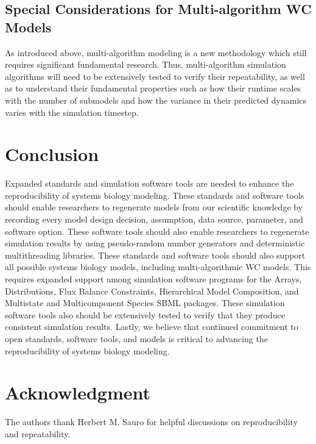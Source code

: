 \documentclass[journal,transmag,twoside]{IEEEtran}
\begin{document}
\subsection{Special Considerations for Multi-algorithm WC Models}
As introduced above, multi-algorithm modeling is a new methodology which still requires significant fundamental research. Thus, multi-algorithm simulation algorithms will need to be extensively tested to verify their repeatability, as well as to understand their fundamental properties such as how their runtime scales with the number of submodels and how the variance in their predicted dynamics varies with the simulation timestep.

\section{Conclusion}

Expanded standards and simulation software tools are needed to enhance the reproducibility of systems biology modeling. These standards and software tools should enable researchers to regenerate models from our scientific knowledge by recording every model design decision, assumption, data source, parameter, and software option. These software tools should also enable researchers to regenerate simulation results by using pseudo-random number generators and deterministic multithreading libraries. These standards and software tools should also support all possible systems biology models, including multi-algorithmic WC models. This requires expanded support among simulation software programs for the Arrays, Distributions, Flux Balance Constraints, Hierarchical Model Composition, and Multistate and Multicomponent Species SBML packages. These simulation software tools also should be extensively tested to verify that they produce consistent simulation results. Lastly, we believe that continued commitment to open standards, software tools, and models is critical to advancing the reproducibility of systems biology modeling.

\section{Acknowledgment}

The authors thank Herbert M. Sauro for helpful discussions
on reproducibility and repeatability.

\ifCLASSOPTIONcaptionsoff
  \newpage
\fi
\end{document}
